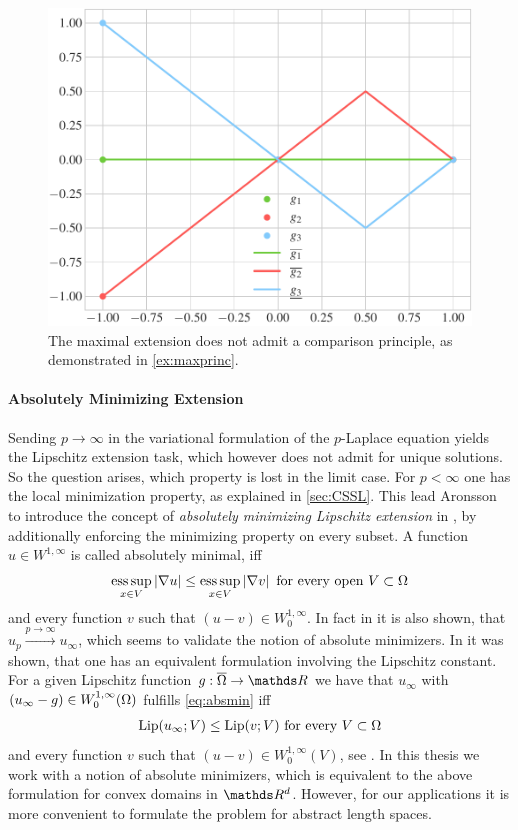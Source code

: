 %
\begin{figure}
\centering
\includegraphics[width=.5\textwidth]{code/lipextcomp/comp.pdf}
\caption{The maximal extension does not admit a comparison principle, as demonstrated in \cref{ex:maxprinc}.}\label{fig:maxprinc}
\end{figure}
%
%
\paragraph{Absolutely Minimizing Extension}\label{sec:AMLE}
%
Sending $p\to\infty$ in the variational formulation of the $p$-Laplace equation 
yields the Lipschitz extension task, which however does not admit for unique solutions. So the question arises, which property is lost in the limit case. For $p<\infty$ one has the local minimization property, as explained in \cref{sec:CSSL}. This lead Aronsson to introduce the concept of \emph{absolutely minimizing Lipschitz extension} in \cite{aronsson1967extension}, by additionally enforcing the minimizing property on every subset. A function $u\in W^{1,\infty}$ is called absolutely minimal, iff
%
\begin{align}\label{eq:absmin}
\operatorname*{ess\,sup}_{x\in V} \left|\nabla u\right| \leq \operatorname*{ess\,sup}_{x\in V} \left|\nabla v\right| \text{ for every open } V\subset \Omega
\end{align}
%
and every function $v$ such that $(u-v)\in W^{1,\infty}_0$. In fact in \cite{aronsson1967extension} it is also shown, that 
$u_p\xrightarrow{p\to\infty} u_\infty$, which seems to validate the notion of absolute minimizers. In \cite{aronsson2004tour} it was shown, that one has an equivalent formulation involving the Lipschitz constant. For a given Lipschitz function $g:\overline{\domain}\to\R$ we have that $u_\infty$ with $(u_\infty-g)\in W^{1,\infty}_0(\Omega)$ fulfills \cref{eq:absmin} iff
%
\begin{align*}
\operatorname{Lip}(u_\infty; V) \leq \operatorname{Lip}(v; V) \text{ for every } V\subset \Omega
\end{align*}
%
and every function $v$ such that $(u-v)\in W^{1,\infty}_0(V)$, see \cite{aronsson1967extension}. In this thesis we work with a notion of absolute minimizers, which is equivalent to the above formulation for convex domains in $\R^d$. However, for our applications it is more convenient to formulate the problem for abstract length spaces.
